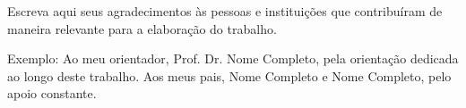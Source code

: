 \begin{agradecimentos}
Escreva aqui seus agradecimentos às pessoas e instituições que
contribuíram de maneira relevante para a elaboração do trabalho.

Exemplo: Ao meu orientador, Prof. Dr. Nome Completo, pela orientação
dedicada ao longo deste trabalho. Aos meus pais, Nome Completo e Nome
Completo, pelo apoio constante.
\end{agradecimentos}
